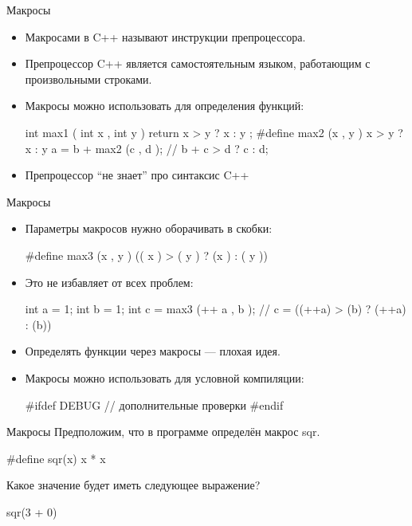 \documentclass[
    9pt,
    hyperref={pdfencoding=unicode}
    ]{beamer}
\begin{document}
\begin{frame}[fragile]{Макросы}
    \begin{itemize}
        \item Макросами в C++ называют инструкции препроцессора.
        \item Препроцессор C++ является самостоятельным языком,
        работающим с произвольными строками.

        \item Макросы можно использовать для определения функций:
        \begin{cppcode}
            int max1 ( int x , int y ) {
                return x > y ? x : y ;
            }
            #define max2 (x , y ) x > y ? x : y
            a = b + max2 (c , d ); // b + c > d ? c : d;
        \end{cppcode}
        \item Препроцессор “не знает” про синтаксис C++
    \end{itemize}
\end{frame}

\begin{frame}[fragile]{Макросы}
    \begin{itemize}
        \item Параметры макросов нужно оборачивать в скобки:
        \begin{cppcode}
            #define max3 (x , y ) (( x ) > ( y ) ? (x ) : ( y ))
        \end{cppcode}
        \item Это не избавляет от всех проблем:
        \begin{cppcode}
            int a = 1;
            int b = 1;
            int c = max3 (++ a , b );
            // c = ((++a) > (b) ? (++a) : (b))
        \end{cppcode}
        \item Определять функции через макросы — плохая идея.
        \item Макросы можно использовать для условной компиляции:
        \begin{cppcode}
            #ifdef DEBUG
            // дополнительные проверки
            #endif

        \end{cppcode}
    \end{itemize}
\end{frame}

\begin{frame}[fragile]{Макросы}
    Предположим, что в программе определён макрос sqr.
    \begin{cppcode}
        #define sqr(x) x * x
    \end{cppcode}
    
    Какое значение будет иметь следующее выражение?
    \begin{cppcode}
        sqr(3 + 0)
    \end{cppcode}
\end{frame}
\end{document}
